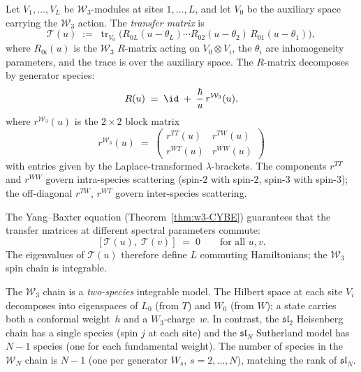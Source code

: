 \begin{construction}
\label{constr:w3-transfer-matrix}
%
%
Let $V_1, \ldots, V_L$ be $\mathcal{W}_3$-modules at sites
$1, \ldots, L$, and let $V_0$ be the auxiliary space carrying
the $\mathcal{W}_3$ action. The \emph{transfer matrix} is
\begin{equation}
\label{eq:w3-transfer-matrix}
\mathcal{T}(u)
\;:=\;
\operatorname{tr}_{V_0}\!\bigl(
 R_{0L}(u - \theta_L) \cdots R_{02}(u - \theta_2)\,
 R_{01}(u - \theta_1)
\bigr),
\end{equation}
where $R_{0i}(u)$ is the $\mathcal{W}_3$ $R$-matrix acting on
$V_0 \otimes V_i$, the $\theta_i$ are inhomogeneity parameters,
and the trace is over the auxiliary space. The $R$-matrix
decomposes by generator species:
\begin{equation}
\label{eq:w3-R-matrix-components}
R(u) \;=\; \id \;+\; \frac{\hbar}{u}\,r^{\mathcal{W}_3}(u),
\end{equation}
where $r^{\mathcal{W}_3}(u)$ is the $2 \times 2$ block matrix
\[
r^{\mathcal{W}_3}(u)
\;=\;
\begin{pmatrix}
r^{TT}(u) & r^{TW}(u) \\
r^{WT}(u) & r^{WW}(u)
\end{pmatrix}
\]
with entries given by the Laplace-transformed $\lambda$-brackets.
The components $r^{TT}$ and $r^{WW}$ govern intra-species
scattering (spin-$2$ with spin-$2$, spin-$3$ with spin-$3$);
the off-diagonal $r^{TW}$, $r^{WT}$ govern inter-species
scattering.

The Yang--Baxter equation
(Theorem~\ref{thm:w3-CYBE}) guarantees that the transfer
matrices at different spectral parameters commute:
\begin{equation}
\label{eq:w3-transfer-commute}
[\mathcal{T}(u),\; \mathcal{T}(v)] \;=\; 0
\qquad\text{for all } u, v.
\end{equation}
The eigenvalues of $\mathcal{T}(u)$ therefore define $L$
commuting Hamiltonians; the $\mathcal{W}_3$ spin chain
is integrable.
\end{construction}

\begin{remark}%
\label{rem:multi-component-chain}%
%
The $\mathcal{W}_3$ chain is a \emph{two-species} integrable
model. The Hilbert space at each site $V_i$ decomposes into
eigenspaces of $L_0$ (from $T$) and $W_0$ (from $W$); a state
carries both a conformal weight~$h$ and a $W_3$-charge~$w$.
In contrast, the $\mathfrak{sl}_2$ Heisenberg chain has a single
species (spin $j$ at each site) and the $\mathfrak{sl}_N$
Sutherland model has $N-1$ species (one for each fundamental
weight). The number of species in the $\mathcal{W}_N$ chain
is $N - 1$ (one per generator $W_s$, $s = 2, \ldots, N$),
matching the rank of $\mathfrak{sl}_N$.
\end{remark}

